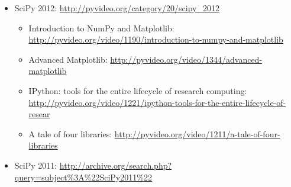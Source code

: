 \begin{itemize}
  \item SciPy 2012: \url{http://pyvideo.org/category/20/scipy\_2012}
    \begin{itemize}
      \item Introduction to NumPy and Matplotlib: \url{http://pyvideo.org/video/1190/introduction-to-numpy-and-matplotlib}
      \item Advanced Matplotlib: \url{http://pyvideo.org/video/1344/advanced-matplotlib}
      \item IPython: tools for the entire lifecycle of research computing: \url{http://pyvideo.org/video/1221/ipython-tools-for-the-entire-lifecycle-of-resear}
      \item A tale of four libraries: \url{http://pyvideo.org/video/1211/a-tale-of-four-libraries}
    \end{itemize}
  \item SciPy 2011: \url{http://archive.org/search.php?query=subject\%3A\%22SciPy2011\%22}
\end{itemize}
